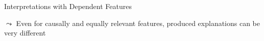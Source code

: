 \documentclass[11pt,compress,t,notes=noshow, aspectratio=169, xcolor=table]{beamer}
\begin{document}
\begin{frame}{Interpretations with Dependent Features}
\begin{itemize}
$\leadsto$ Even for causally and equally relevant features, produced explanations can be very different


\pause 



\end{itemize}
\end{frame}
\end{document}
